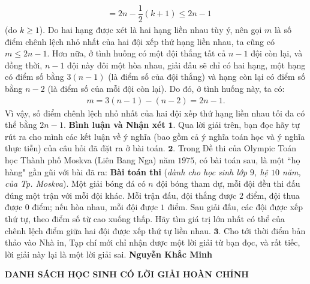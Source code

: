 \begin{multicols}{2}
\begin{align*}
		&= 2n - \dfrac{1}{2}\left( {k + 1} \right) \le 2n - 1
	\end{align*}
	(do $k \ge 1$).
	\vskip 0.05cm
	Do hai hạng được xét là hai hạng liền nhau tùy ý, nên gọi $m$ là số điểm chênh lệch nhỏ nhất của hai đội xếp thứ hạng liền nhau, ta cũng có $m \le 2n - 1$.
	\vskip 0.05cm
	Hơn nữa, ở tình huống có một đội thắng tất cả $n - 1$ đội còn lại, và đồng thời, $n - 1$ đội này đôi một hòa nhau, giải đấu sẽ chỉ có hai hạng, một hạng có điểm số bằng $3(n - 1)$ (là điểm số của đội thắng) và hạng còn lại có điểm số bằng $n - 2$ (là điểm số của mỗi đội còn lại). Do đó, ở tình huống này, ta có:
	\begin{align*}
		m = 3(n - 1) - (n - 2) = 2n - 1.
	\end{align*}
	Vì vậy, số điểm chênh lệch nhỏ nhất của hai đội xếp thứ hạng liền nhau tối đa có thể bằng $2n - 1$.
	\vskip 0.05cm
	\textbf{\color{thachthuctoanhoc}Bình luận và Nhận xét}
	\vskip 0.05cm
	$\pmb{1.}$ Qua lời giải trên, bạn đọc hãy tự rút ra cho mình các kết luận về ý nghĩa (bao gồm cả ý nghĩa toán học và ý nghĩa thực tiễn) của câu hỏi đã đặt ra ở bài toán.
	\vskip 0.05cm
	$\pmb{2.}$ Trong Đề thi của Olympic Toán học Thành phố Moskva (Liên Bang Nga) năm $1975$, có bài toán sau, là một ``họ hàng" gần gũi với bài đã ra:
	\vskip 0.05cm
	\textbf{\color{thachthuctoanhoc}Bài toán thi} (\textit{dành cho học sinh lớp $9$, hệ $10$ năm, của Tp. Moskva}). Một giải bóng đá có $n$ đội bóng tham dự, mỗi đội đều thi đấu đúng một trận với mỗi đội khác. Mỗi trận đấu, đội thắng được $2$ điểm, đội thua được $0$ điểm; nếu hòa nhau, mỗi đội được $1$ điểm. Sau giải đấu, các đội được xếp thứ tự, theo điểm số từ cao xuống thấp. Hãy tìm giá trị lớn nhất có thể của chênh lệch điểm giữa hai đội được xếp thứ tự liền nhau.
	\vskip 0.05cm
	$\pmb{3.}$ Cho tới thời điểm bản thảo vào Nhà in, Tạp chí mới chỉ nhận được một lời giải từ bạn đọc, và rất tiếc, lời giải này lại là một lời giải sai.
	\vskip 0.1cm
	\hfill\textbf{\color{thachthuctoanhoc}Nguyễn Khắc Minh}
\end{multicols}
\centerline{\textbf{\color{thachthuctoanhoc}DANH SÁCH HỌC SINH CÓ LỜI GIẢI HOÀN CHỈNH}}
